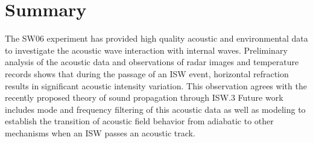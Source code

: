 
\chapter{Summary}
The SW06 experiment has provided high quality acoustic and
environmental data to investigate the acoustic wave interaction with
internal waves. Preliminary analysis of the acoustic data and
observations of radar images and temperature records shows that
during the passage of an ISW event, horizontal refraction results in
significant acoustic intensity variation. This observation agrees
with the recently proposed theory of sound propagation through ISW.3
Future work includes mode and frequency filtering of this acoustic
data as well as modeling to establish the transition of acoustic
field behavior from adiabatic to other mechanisms when an ISW passes
an acoustic track.
